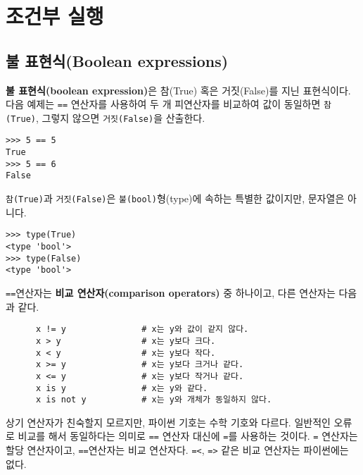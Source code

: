 
\chapter{조건부 실행}

\section{불 표현식(Boolean expressions)}

{\bf 불 표현식(boolean expression)}은 참(True) 혹은 거짓(False)를 지닌 표현식이다. 
다음 예제는 {\tt ==} 연산자를 사용하여 두 개 피연산자를 비교하여 값이 동일하면 {\tt 참(True)}, 그렇지 않으면 {\tt 거짓(False)}을 산출한다.

\beforeverb
\begin{verbatim}
>>> 5 == 5
True
>>> 5 == 6
False
\end{verbatim}
\afterverb
%

{\tt 참(True)}과 {\tt 거짓(False)}은 {\tt 불(bool)}형(type)에 속하는 특별한 값이지만, 문자열은 아니다.


\beforeverb
\begin{verbatim}
>>> type(True)
<type 'bool'>
>>> type(False)
<type 'bool'>
\end{verbatim}
\afterverb
%

{\tt ==}연산자는 {\bf 비교 연산자(comparison operators)} 중 하나이고, 다른 연산자는 다음과 같다.

\beforeverb
\begin{verbatim}
      x != y               # x는 y와 값이 같지 않다.
      x > y                # x는 y보다 크다.
      x < y                # x는 y보다 작다.
      x >= y               # x는 y보다 크거나 같다.
      x <= y               # x는 y보다 작거나 같다.
      x is y               # x는 y와 같다.
      x is not y           # x는 y와 개체가 동일하지 않다.
\end{verbatim}
\afterverb
%
상기 연산자가 친숙할지 모르지만, 파이썬 기호는 수학 기호와 다르다. 
일반적인 오류로 비교를 해서 동일하다는 의미로 {\tt ==} 연산자 대신에 {\tt =}를 사용하는 것이다.
{\tt =} 연산자는 할당 연산자이고, {\tt ==}연산자는 비교 연산자다. 
{\tt =<}, {\tt =>} 같은 비교 연산자는 파이썬에는 없다.

